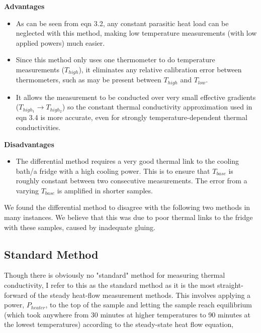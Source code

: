 \documentclass{report}
\begin{document}
\textbf{Advantages}
\begin{itemize}
\item As can be seen from eqn 3.2, any constant parasitic heat load can be neglected with this method, making low temperature measurements (with low applied powers) much easier.
\item Since this method only uses one thermometer to do temperature measurements ($T_{high}$), it eliminates any relative calibration error between thermometers, such as may be present between $T_{high}$ and $T_{low}$.
\item It allows the measurement to be conducted over very small effective gradients ($T_{high_1} \rightarrow T_{high_2}$) so the constant thermal conductivity approximation used in eqn 3.4 is more accurate, even for strongly temperature-dependent thermal conductivities.
\end{itemize}

\bigskip

\textbf{Disadvantages}
\begin{itemize}
\item The differential method requires a very good thermal link to the cooling bath/a fridge with a high cooling power. This is to ensure that $T_{base}$ is roughly constant between two consecutive measurements. The error from a varying $T_{base}$ is amplified in shorter samples.
\end{itemize}

We found the differential method to disagree with the following two methods in many instances. We believe that this was due to poor thermal links to the fridge with these samples, caused by inadequate gluing.

\subsection{Standard Method}
Though there is obviously no "standard" method for measuring thermal conductivity, I refer to this as the standard method as it is the most straight-forward of the steady heat-flow measurement methods. This involves applying a power, $P_{heater}$, to the top of the sample and letting the sample reach equilibrium (which took anywhere from 30 minutes at higher temperatures to 90 minutes at the lowest temperatures) according to the steady-state heat flow equation,
\end{document}
